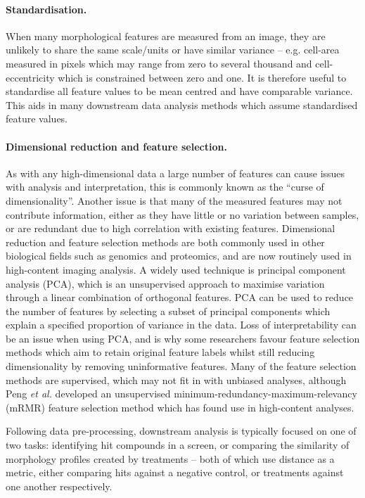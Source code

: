\documentclass[a4paper,11pt,twoside,openright]{scrbook}
\begin{document}
\paragraph{Standardisation.}
When many morphological features are measured from an image, they are unlikely to share the same scale/units or have 
similar variance -- e.g. cell-area measured in pixels which may range from zero to several thousand and 
cell-eccentricity which is constrained between zero and one.
It is therefore useful to standardise all feature values to be mean centred and have comparable variance.
This aids in many downstream data analysis methods which assume standardised feature values.

\paragraph{Dimensional reduction and feature selection.}
As with any high-dimensional data a large number of features can cause issues with analysis and interpretation, this is 
commonly known as the ``curse of dimensionality''. \cite{Bellman1961}
Another issue is that many of the measured features may not contribute information, either as they have little or no 
variation between samples, or are redundant due to high correlation with existing features.
Dimensional reduction and feature selection methods are both commonly used in other biological fields such as genomics 
and proteomics, and are now routinely used in high-content imaging analysis.
A widely used technique is principal component analysis (PCA), which is an unsupervised approach to maximise variation 
through a linear combination of orthogonal features.
PCA can be used to reduce the number of features by selecting a subset of principal components which explain a 
specified proportion of variance in the data.
Loss of interpretability can be an issue when using PCA, and is why some researchers favour feature selection methods 
which aim to retain original feature labels whilst still reducing dimensionality by removing uninformative features.
Many of the feature selection methods are supervised, which may not fit in with unbiased analyses, although Peng 
\textit{et al.} developed an unsupervised minimum-redundancy-maximum-relevancy (mRMR) feature selection method which 
has found use in high-content analyses. \cite{Peng2005}\newline


Following data pre-processing, downstream analysis is typically focused on one of two tasks: identifying hit compounds 
in a screen, or comparing the similarity of morphology profiles created by treatments -- both of which use distance as 
a metric, either comparing hits against a negative control, or treatments against one another respectively.
\end{document}
